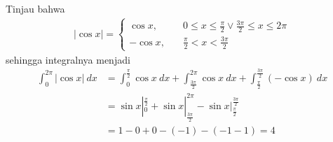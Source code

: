 \documentclass{article}
\begin{document}
\begin{enumerate}
	Tinjau bahwa 
	\begin{align*}
	|\cos x| = \begin{cases}
	\cos x, \quad &0\leq x\leq \frac{\pi}{2} \vee \frac{3\pi}{2} \leq x\leq 2\pi\\
	-\cos x, \quad & \frac{\pi}{2}< x< \frac{3\pi}{2}
	\end{cases}
	\end{align*}
	sehingga integralnya menjadi 
	\begin{align*}
	\int_0^{2\pi} |\cos x| ~ dx &= \int_0^{\frac{\pi}{2}} \cos x~ dx + \int_{\frac{3\pi}{2}}^{2\pi} \cos x ~dx + \int_{\frac{\pi}{2}}^{\frac{3\pi}{2}} (-\cos x)~ dx\\
	&= \sin x|_0^{\frac{\pi}{2}} + \sin x|_{\frac{3\pi}{2}}^{2\pi} -\sin x|_{\frac{\pi}{2}}^{\frac{3\pi}{2}}\\
	&= 1-0 + 0-(-1) - (-1-1) = 4
	\end{align*}
\end{enumerate}
\newpage
\end{document}
